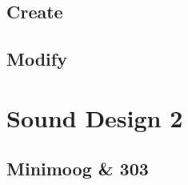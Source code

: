 \documentclass[
]{book}
\begin{document}
\hypertarget{create-1}{%
\chapter{Create}\label{create-1}}

\hypertarget{modify-1}{%
\chapter{Modify}\label{modify-1}}

\hypertarget{part-sound-design-2}{%
\part{Sound Design 2}\label{part-sound-design-2}}

\hypertarget{minimoog-303}{%
\chapter{Minimoog \& 303}\label{minimoog-303}}

  
\end{document}
